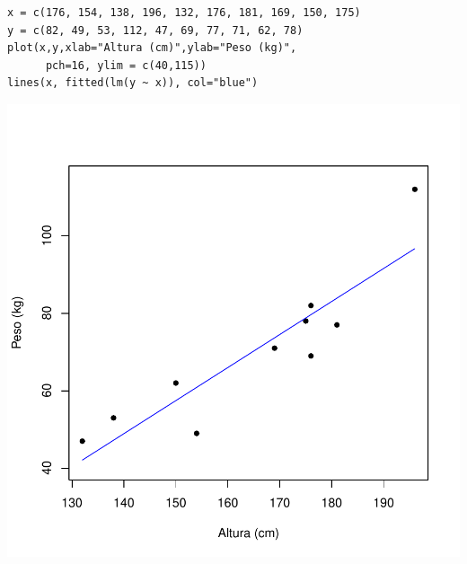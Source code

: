 \documentclass[14pt,aspectratio=1610]{beamer}
\begin{document}
\begin{frame}[fragile]{}
\frametitle{ }
\begin{block}{}
\begin{center}

\begin{verbatim}
x = c(176, 154, 138, 196, 132, 176, 181, 169, 150, 175)
y = c(82, 49, 53, 112, 47, 69, 77, 71, 62, 78)
plot(x,y,xlab="Altura (cm)",ylab="Peso (kg)",
      pch=16, ylim = c(40,115))
lines(x, fitted(lm(y ~ x)), col="blue")    
\end{verbatim}

\end{center}
\end{block}
\vspace{-1.3cm}
\begin{center}
\includegraphics{Aula4Regressao/Figuras/Aula4-002.pdf}
\end{center}
\end{frame}
\end{document}
